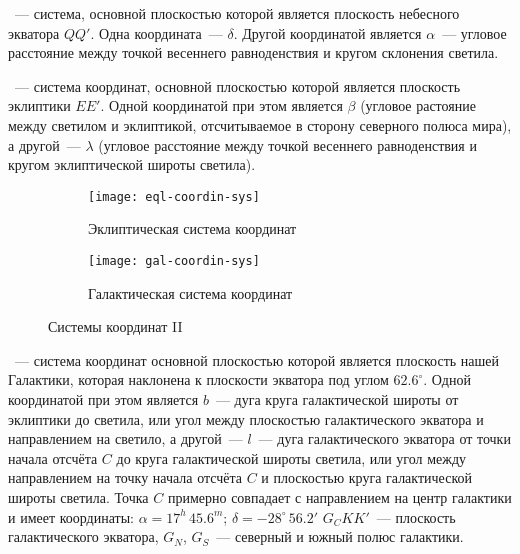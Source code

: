 ~--- система, основной плоскостью которой является плоскость небесного экватора $QQ'$. Одна координата~---  $\delta$. Другой координатой является  $\alpha$~--- угловое расстояние между точкой весеннего равноденствия и кругом склонения светила.

~--- система координат, основной плоскостью которой является плоскость эклиптики $EE'$. Одной координатой при этом является  $\beta$ (угловое растояние между светилом и эклиптикой, отсчитываемое в сторону северного полюса мира), а другой~---  $\lambda$ (угловое расстояние между точкой весеннего равноденствия и кругом эклиптической широты светила).

\begin{figure}[!h]
\centering
	\begin{subfigure}{0.49\textwidth}
		\texttt{[image: eql-coordin-sys]}
		\caption{Эклиптическая система координат}
	 \end{subfigure}
	 \hfill
	\begin{subfigure}{0.49\textwidth}
		\texttt{[image: gal-coordin-sys]}
		\caption{Галактическая система координат}
	 \end{subfigure}
	\caption{Системы координат II}
\end{figure}

~--- система координат основной плоскостью которой является плоскость нашей Галактики, которая наклонена к плоскости экватора под углом $62.6^{\circ}$. Одной координатой при этом является  $b$~--- дуга круга галактической широты от эклиптики до светила, или угол между плоскостью галактического экватора и направлением на светило, а другой~---  $l$~--- дуга галактического экватора от точки начала отсчёта $C$ до круга галактической широты светила, или угол между направлением на точку начала отсчёта $C$ и плоскостью круга галактической широты светила. Точка $C$ примерно совпадает с направлением на центр галактики и имеет координаты: $\alpha=17^h\,45.6^m$; $\delta=-28^{\circ}\,56.2'$ $G_CKK'$~--- плоскость галактического экватора, $G_N$, $G_S$~--- северный и южный полюс галактики.